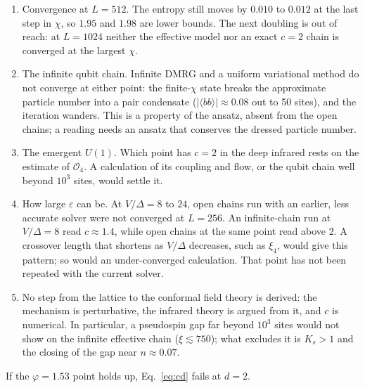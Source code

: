 \documentclass[11pt]{article}
\begin{document}
\begin{enumerate}[leftmargin=*,itemsep=1pt,topsep=3pt]
\item Convergence at $L=512$. The entropy still moves by $0.010$ to $0.012$ at the last step in $\chi$, so $1.95$ and $1.98$ are lower bounds. The next doubling is out of reach: at $L=1024$ neither the effective model nor an exact $c=2$ chain is converged at the largest $\chi$.
\item The infinite qubit chain. Infinite DMRG and a uniform variational method do not converge at either point: the finite-$\chi$ state breaks the approximate particle number into a pair condensate ($|\langle bb\rangle|\approx0.08$ out to 50 sites), and the iteration wanders. This is a property of the ansatz, absent from the open chains; a reading needs an ansatz that conserves the dressed particle number.
\item The emergent $U(1)$. Which point has $c=2$ in the deep infrared rests on the estimate of $\mathcal O_4$. A calculation of its coupling and flow, or the qubit chain well beyond $10^3$ sites, would settle it.
\item How large $\varepsilon$ can be. At $V/\Delta=8$ to $24$, open chains run with an earlier, less accurate solver were not converged at $L=256$. An infinite-chain run at $V/\Delta=8$ read $c\approx1.4$, while open chains at the same point read above 2. A crossover length that shortens as $V/\Delta$ decreases, such as $\xi_4$, would give this pattern; so would an under-converged calculation. That point has not been repeated with the current solver.
\item No step from the lattice to the conformal field theory is derived: the mechanism is perturbative, the infrared theory is argued from it, and $c$ is numerical. In particular, a pseudospin gap far beyond $10^3$ sites would not show on the infinite effective chain ($\xi\lesssim750$); what excludes it is $K_s>1$ and the closing of the gap near $n\approx0.07$.
\end{enumerate}

If the $\varphi=1.53$ point holds up, Eq.~\eqref{eq:cd} fails at $d=2$.
\end{document}
